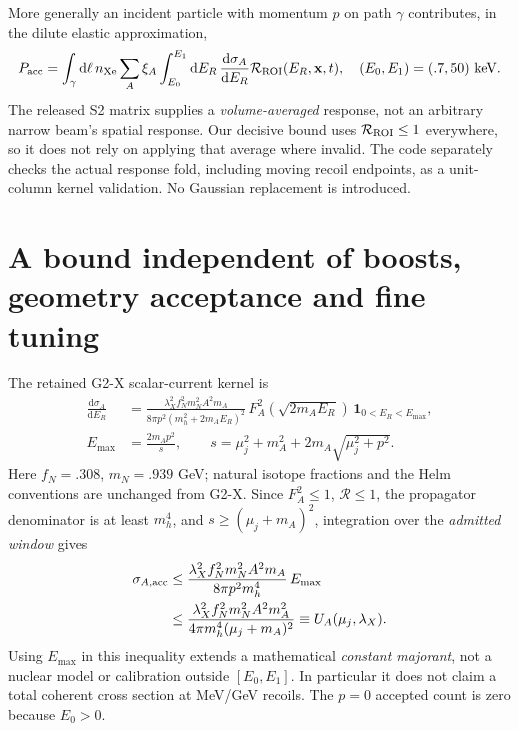 \documentclass[11pt,a4paper]{article}
\newcommand{\dd}{\mathrm d}
\begin{document}
More generally an incident particle with momentum $p$ on path $\gamma$
contributes, in the dilute elastic approximation,
\begin{equation}\label{eq:path}
 P_{\rm acc}=\int_\gamma \dd\ell\, n_{\rm Xe}
 \sum_A\xi_A\int_{E_0}^{E_1}\dd E_R\,
 \frac{\dd\sigma_A}{\dd E_R}
 \mathcal R_{\rm ROI}(E_R,\mathbf x,t),
 \quad (E_0,E_1)=(.7,50)\ {\rm keV}.
\end{equation}
The released S2 matrix supplies a \emph{volume-averaged} response, not
an arbitrary narrow beam's spatial response. Our decisive bound uses
$\mathcal R_{\rm ROI}\leq1$ everywhere, so it does not rely on applying
that average where invalid. The code separately checks the actual
response fold, including moving recoil endpoints, as a unit-column
kernel validation. No Gaussian replacement is introduced.

\section{A bound independent of boosts, geometry acceptance and fine tuning}
The retained G2-X scalar-current kernel is
\begin{align}
 \frac{\dd\sigma_A}{\dd E_R}
 &=\frac{\lambda_X^2 f_N^2m_N^2 A^2m_A}
 {8\pi p^2(m_h^2+2m_AE_R)^2}\,
 F_A^2(\sqrt{2m_AE_R})\,
 \mathbf1_{0<E_R<E_{\max}},\\
 E_{\max}&=\frac{2m_Ap^2}{s},\qquad
 s=\mu_j^2+m_A^2+2m_A\sqrt{\mu_j^2+p^2}.
\end{align}
Here $f_N=.308$, $m_N=.939$ GeV; natural isotope fractions and the
Helm conventions are unchanged from G2-X. Since $F_A^2\leq1$,
$\mathcal R\leq1$, the propagator denominator is at least $m_h^4$,
and $s\geq(\mu_j+m_A)^2$, integration over the \emph{admitted window}
gives
\begin{align}
 \sigma_{A,\rm acc}
 &\leq \frac{\lambda_X^2 f_N^2m_N^2 A^2m_A}
 {8\pi p^2m_h^4}\,E_{\max}\\
 &\leq\frac{\lambda_X^2 f_N^2m_N^2 A^2m_A^2}
 {4\pi m_h^4(\mu_j+m_A)^2}
 \equiv U_A(\mu_j,\lambda_X). \label{eq:majorant}
\end{align}
Using $E_{\max}$ in this inequality extends a mathematical \emph{constant
majorant}, not a nuclear model or calibration outside $[E_0,E_1]$.
In particular it does not claim a total coherent cross section at
MeV/GeV recoils. The $p=0$ accepted count is zero because $E_0>0$.
\end{document}
